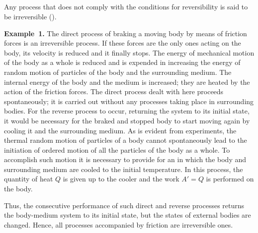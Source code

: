 \subsection{}\label{11.2.2} Any process that does not comply with the conditions for reversibility is said to be irreversible (). 

\textbf{Example~1.} The direct process of braking a moving body by means of friction forces is an irreversible process. If these forces are the only ones acting on the body, its velocity is reduced and it finally stops. The energy of mechanical motion of the body as a whole is reduced and is expended in increasing the energy of random motion of particles of the body and the surrounding medium. The internal energy  of the body and the medium is increased; they are heated by the action of the friction forces. The direct process dealt with here proceeds spontaneously; it is carried out without any processes taking place in surrounding bodies. For the reverse process to occur, returning the system to its initial state, it would be necessary for the braked and stopped body to start moving again by cooling it and the surrounding medium. As is evident from experiments, the thermal random motion of particles of a body cannot spon­taneously lead to the initiation of ordered motion of all the particles of the body as a whole. To accomplish such motion it is necessary to provide for an  in which the body and surrounding medium are cooled to the initial temperature. In this process, the quantity of heat $Q$ is given up to the cooler and the work $A' = Q$ is performed on the body.

Thus, the consecutive performance of such direct and reverse processes returns the body-medium system to its initial state, but the states of external bodies are changed. Hence, all pro­cesses accompanied by friction are irreversible ones.

